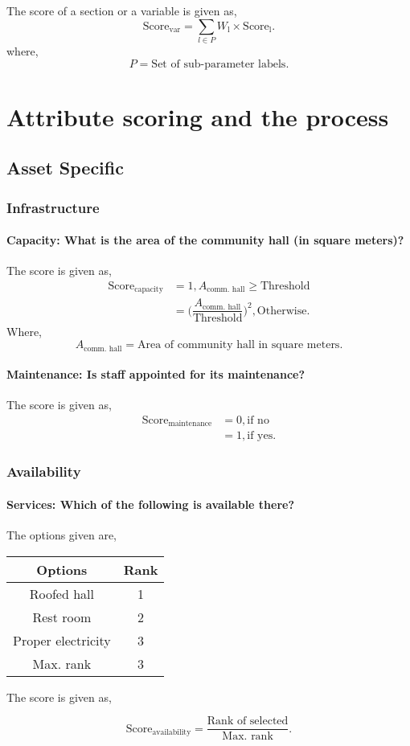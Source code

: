 \documentclass[oneside,twocolumn]{article}
\newcommand{\tsub}[2]{\text{#1}_{\text{#2}}}
\newcommand{\tsubb}[2]{#1_{\text{#2}}}
\newcommand{\dsub}[2]{\dfrac{\text{#1}}{\text{#2}}}
\newcommand{\singsel}[1]
{
	\[
		\tsub{Score}{#1} = \dsub{Rank of selected}{Max. rank}.
	\]
}
\newenvironment{ttable}
{
\begin{center}
\begin{tabular}{c|c}
\hline
}
{
\\ \hline
\end{tabular}
\end{center}
}
\begin{document}
The score of a section or a variable is given as,
\[
	\tsub{Score}{var} = \sum_{l \in P} \tsubb{W}{l} \times \tsub{Score}{l}.
\]
where,
\[
	P = \text{Set of sub-parameter labels.}
\]	

\section{Attribute scoring and the process}
\subsection{Asset Specific}
\subsubsection{Infrastructure}
\paragraph{Capacity: What is the area of the community hall (in square meters)?}
The score is given as,
\begin{align*}
	\tsub{Score}{capacity} &= 1, \tsubb{A}{comm. hall} \ge \text{Threshold} \\
	&= \Big( \dfrac{\tsubb{A}{comm. hall}}{\text{Threshold}} \Big)^{2}, \text{Otherwise}.
\end{align*}
Where,
\[
	\tsubb{A}{comm. hall} = \text{Area of community hall in square meters.}
\]	
\paragraph{Maintenance: Is staff appointed for its maintenance?}
The score is given as,
\begin{align*}
	\tsub{Score}{maintenance} &= 0, \text{if no} \\
	&= 1, \text{if yes}.
\end{align*}
\subsubsection{Availability}
\paragraph{Services: Which of the following is available there?}
The options given are,
\begin{ttable}
	Options & Rank \\ \hline
	Roofed hall & 1 \\
	Rest room & 2 \\
	Proper electricity & 3 \\ \hline
	Max. rank & 3
\end{ttable}
The score is given as,
\singsel{availability}
\end{document}
